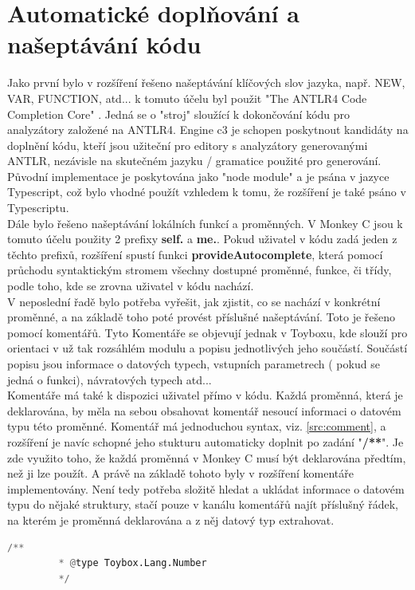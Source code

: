 \section{Automatické doplňování a našeptávání kódu}
Jako první bylo v rozšíření řešeno našeptávání klíčových slov jazyka, např. NEW, VAR, FUNCTION, atd... k tomuto účelu byl použit "The ANTLR4 Code Completion Core" \cite{mike_lischke}. Jedná se o "stroj" sloužící k dokončování kódu pro analyzátory založené na ANTLR4. Engine c3 je schopen poskytnout kandidáty na doplnění kódu, kteří jsou užiteční pro editory s analyzátory generovanými ANTLR, nezávisle na skutečném jazyku / gramatice použité pro generování. Původní implementace je poskytována jako "node module" a je psána v jazyce Typescript, což bylo vhodné použít vzhledem k tomu, že rozšíření je také psáno v Typescriptu.
\\
Dále bylo řešeno našeptávání lokálních funkcí a proměnných. V Monkey C jsou k tomuto účelu použity 2 prefixy \textbf{self.} a \textbf{me.}. Pokud uživatel v kódu zadá jeden z těchto prefixů, rozšíření spustí funkci \textbf{provideAutocomplete}, která pomocí průchodu syntaktickým stromem všechny dostupné proměnné, funkce, či třídy, podle toho, kde se zrovna uživatel v kódu nachází.
\\
V neposlední řadě bylo potřeba vyřešit, jak zjistit, co se nachází v konkrétní proměnné, a na základě toho poté provést příslušné našeptávání. Toto je řešeno  pomocí komentářů. Tyto Komentáře se objevují jednak v Toyboxu, kde slouží pro orientaci v už tak rozsáhlém modulu a popisu jednotlivých jeho součástí. Součástí popisu jsou informace o datových typech, vstupních parametrech ( pokud se jedná o funkci), návratových typech atd...  
\\
Komentáře má také k dispozici uživatel přímo v kódu. Každá proměnná, která je deklarována, by měla na sebou obsahovat komentář nesoucí informaci o datovém typu této proměnné. Komentář má jednoduchou syntax, viz. \ref{src:comment}, a rozšíření je navíc schopné jeho stukturu automaticky doplnit po zadání "\textbf{/**}". Je zde využito toho, že každá proměnná v Monkey C musí být deklarována předtím, než ji lze použít. A právě na základě tohoto byly v rozšíření komentáře implementovány. Není tedy potřeba složitě hledat a ukládat informace o datovém typu do nějaké struktury, stačí pouze v kanálu komentářů najít příslušný řádek, na kterém je proměnná deklarována a z něj datový typ extrahovat.

\begin{lstlisting}[language=Python,label=src:comment,caption={struktura komentáře datový typ}]
        /**
         * @type Toybox.Lang.Number
         */
\end{lstlisting}

